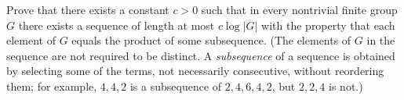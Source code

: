 Prove that there exists a constant $c>0$ such that in every
nontrivial finite group $G$ there exists a sequence of length
at most $c \log |G|$ with the property that each element of $G$
equals the product of some subsequence. (The elements of $G$ in the
sequence are not required to be distinct. A \emph{subsequence}
of a sequence is obtained by selecting some of the terms,
not necessarily consecutive, without reordering them; for
example, $4, 4, 2$ is a subsequence of $2, 4, 6, 4, 2$, but
$2, 2, 4$ is not.)
